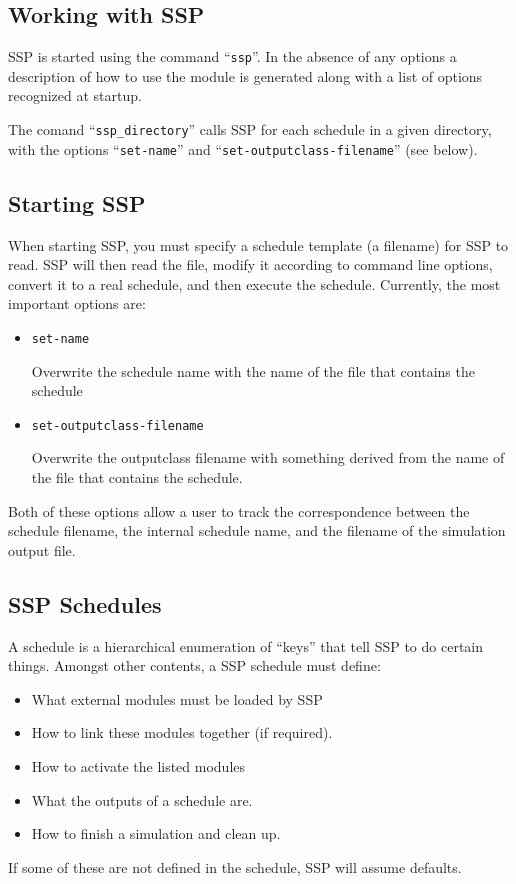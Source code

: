 \documentclass[12pt]{article}
\begin{document}
\subsection*{Working with SSP}

SSP is started using the command ``{\tt ssp}''. In the absence of any options a description of how to use the module is generated along with a list of options recognized at startup.

The comand ``{\tt ssp\_directory}'' calls SSP for each schedule in a given directory, with the options ``{\tt set-name}'' and ``{\tt set-outputclass-filename}'' (see below).

\subsection*{Starting SSP}

When starting SSP, you must specify a schedule template (a filename) for SSP to read. SSP will then read the file, modify it according to command line options, convert it to a real schedule, and then execute the schedule. Currently, the most important options are:
\begin{itemize}
\item[ ]{\tt set-name}

Overwrite the schedule name with the name of the file that contains the schedule
\item[ ]{\tt set-outputclass-filename}

Overwrite the outputclass filename with something derived from the name of the file that contains the schedule.
\end{itemize}
Both of these options allow a user to track the correspondence between the schedule filename, the internal schedule name, and the filename of the simulation output file.

\subsection*{SSP Schedules}

A schedule is a hierarchical enumeration of ``keys'' that tell SSP to do certain things. Amongst other contents, a SSP schedule must define:
\begin{itemize}
\item What external modules must be loaded by SSP
\item How to link these modules together (if required).
\item How to activate the listed modules
\item What the outputs of a schedule are.
\item How to finish a simulation and clean up.
\end{itemize}
If some of these are not defined in the schedule, SSP will assume defaults.
\end{document}
